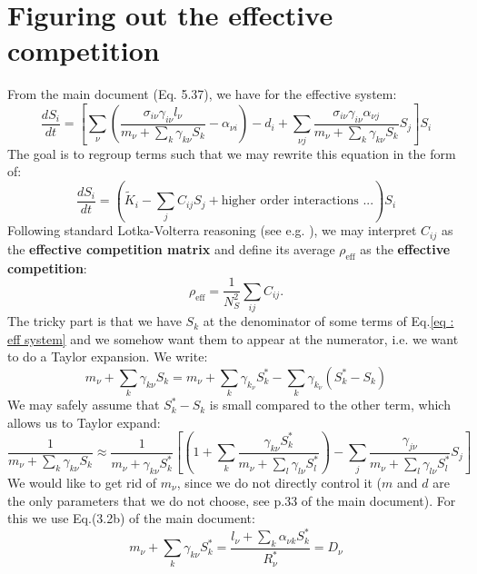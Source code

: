 \documentclass[12pt, titlepage, twoside, openright]{report}
\begin{document}
\section{Figuring out the effective competition}
  From the main document (Eq. 5.37), we have for the effective system:
  \begin{equation}
  \frac{d S_i}{dt} = \left[ \sum_\nu \left( \frac{\sigma_{i\nu} \gamma_{i\nu} l_\nu}{m_\nu + \sum_k \gamma_{k\nu}S_k}-\alpha_{\nu i}\right)-d_i + \sum_{\nu j} \frac{\sigma_{i\nu} \gamma_{i\nu} \alpha_{\nu j}}{m_\nu + \sum_k \gamma_{k\nu} S_k} S_j \right] S_i \label{eq : eff system}
  \end{equation}
  The goal is to regroup terms such that we may rewrite this equation in the form of:
  \begin{equation}
    \frac{d S_i}{dt} = \left( \tilde{K}_i - \sum_j C_{ij} S_j + \text{higher order interactions ...} \right) S_i
  \end{equation}
  Following standard Lotka-Volterra reasoning (see e.g. \cite{dorschner_lotka-volterra_1987}), we may interpret $C_{ij}$ as the \textbf{effective competition matrix} and define its average $\rho_{\text{eff}}$ as the \textbf{effective competition}:
  \begin{equation}
  \rho_{\text{eff}} = \frac{1}{N_S^2}\sum_{ij} C_{ij}.
  \end{equation}
  The tricky part is that we have $S_k$ at the denominator of some terms of Eq.\eqref{eq : eff system} and we somehow want them to appear at the numerator, i.e. we want to do a Taylor expansion. We write:
  \begin{equation}
  m_\nu + \sum_k \gamma_{k\nu} S_k = m_\nu + \sum_k \gamma_{k_\nu}S^*_k - \sum_k \gamma_{k_\nu}\left(S^*_k-S_k\right)
  \end{equation}
  We may safely assume that $S^*_k-S_k$ is small compared to the other term, which allows us to Taylor expand:
  \begin{equation}
  \frac{1}{m_\nu+\sum_k \gamma_{k\nu}S_k} \approx \frac{1}{m_\nu+\gamma_{k\nu}S^*_k}\left[\left(1+\sum_k\frac{ \gamma_{k\nu}S^*_k}{m_\nu + \sum_l \gamma_{l\nu}S^*_l}\right)-\sum_j\frac{ \gamma_{j\nu}}{m_\nu + \sum_l \gamma_{l\nu}S^*_l}S_j\right]
  \end{equation}
  We would like to get rid of $m_\nu$, since we do not directly control it ($m$ and $d$ are the only parameters that we do not choose, see p.33 of the main document). For this we use Eq.(3.2b) of the main document:
  \begin{equation}
  m_\nu + \sum_k \gamma_{k\nu}S^*_k = \frac{l_\nu + \sum_k \alpha_{\nu k} S^*_k}{R^*_\nu} = D_\nu
  \end{equation}
\end{document}
